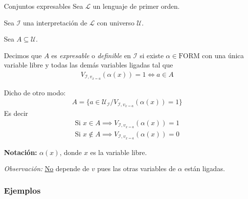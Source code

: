 \begin{definicion}{Conjuntos expresables}{}
    Sea $\mathcal{L}$ un lenguaje de primer orden.

    Sea $\mathcal{I}$ una interpretación de $\mathcal{L}$ con universo 
    $\mathcal{U}$.

    Sea $A \subseteq \mathcal{U}$.

    \medskip

    Decimos que $A$ es \textit{expresable} o \textit{definible} en 
    $\mathcal{I}$ si existe 
    $\alpha \in \mathrm{FORM}$ con una única  variable libre y todas las demás 
    variables ligadas tal que
    \begin{gather*}
        V_{\mathcal{I}, v_{x=a}} (\alpha(x)) = 1 \iff a \in A
    \end{gather*}

    \medskip

    Dicho de otro modo:
    \begin{gather*}
        A = \{ a \in \mathcal{U}_{\mathcal{I}} /
        V_{\mathcal{I}, v_{x=a}} (\alpha(x))=1 \}
    \end{gather*}
    Es decir
    \begin{gather*}
        \text{Si } x \in A \implies V_{\mathcal{I}, v_{x=a}} (\alpha(x)) = 1\\
        \text{Si } x \notin A \implies V_{\mathcal{I}, v_{x=a}} (\alpha(x))=0
    \end{gather*}

    \bigskip
    \textbf{Notación:}
    $\alpha(x)$, donde $x$ es la variable libre.
\end{definicion}

\bigskip
\textit{Observación:}
\underline{No} depende de $v$ pues las otras variables de $\alpha$ están 
ligadas.

\subsubsection{Ejemplos}

